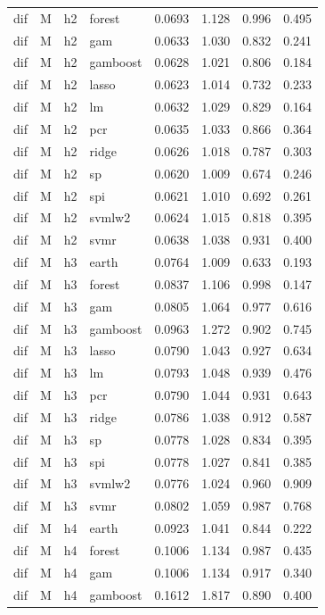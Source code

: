 \begin{ThreePartTable}
\begin{longtable}[t]{llclcccc}
dif & M & h2 & forest & 0.0693 & 1.128 & 0.996 & 0.495\\
dif & M & h2 & gam & 0.0633 & 1.030 & 0.832 & 0.241\\
dif & M & h2 & gamboost & 0.0628 & 1.021 & 0.806 & 0.184\\
dif & M & h2 & lasso & 0.0623 & 1.014 & 0.732 & 0.233\\
dif & M & h2 & lm & 0.0632 & 1.029 & 0.829 & 0.164\\
dif & M & h2 & pcr & 0.0635 & 1.033 & 0.866 & 0.364\\
dif & M & h2 & ridge & 0.0626 & 1.018 & 0.787 & 0.303\\
dif & M & h2 & sp & 0.0620 & 1.009 & 0.674 & 0.246\\
dif & M & h2 & spi & 0.0621 & 1.010 & 0.692 & 0.261\\
dif & M & h2 & svmlw2 & 0.0624 & 1.015 & 0.818 & 0.395\\
dif & M & h2 & svmr & 0.0638 & 1.038 & 0.931 & 0.400\\
\addlinespace
dif & M & h3 & earth & 0.0764 & 1.009 & 0.633 & 0.193\\
dif & M & h3 & forest & 0.0837 & 1.106 & 0.998 & 0.147\\
dif & M & h3 & gam & 0.0805 & 1.064 & 0.977 & 0.616\\
dif & M & h3 & gamboost & 0.0963 & 1.272 & 0.902 & 0.745\\
dif & M & h3 & lasso & 0.0790 & 1.043 & 0.927 & 0.634\\
dif & M & h3 & lm & 0.0793 & 1.048 & 0.939 & 0.476\\
dif & M & h3 & pcr & 0.0790 & 1.044 & 0.931 & 0.643\\
dif & M & h3 & ridge & 0.0786 & 1.038 & 0.912 & 0.587\\
dif & M & h3 & sp & 0.0778 & 1.028 & 0.834 & 0.395\\
dif & M & h3 & spi & 0.0778 & 1.027 & 0.841 & 0.385\\
dif & M & h3 & svmlw2 & 0.0776 & 1.024 & 0.960 & 0.909\\
dif & M & h3 & svmr & 0.0802 & 1.059 & 0.987 & 0.768\\
\addlinespace
dif & M & h4 & earth & 0.0923 & 1.041 & 0.844 & 0.222\\
dif & M & h4 & forest & 0.1006 & 1.134 & 0.987 & 0.435\\
dif & M & h4 & gam & 0.1006 & 1.134 & 0.917 & 0.340\\
dif & M & h4 & gamboost & 0.1612 & 1.817 & 0.890 & 0.400\\

\end{longtable}
\end{ThreePartTable}
